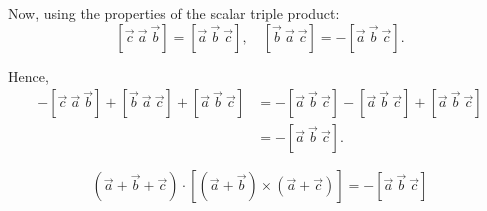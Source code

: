 \documentclass[12pt]{article}
\begin{document}
Now, using the properties of the scalar triple product:
\[
[\vec{c}\ \vec{a}\ \vec{b}] = [\vec{a}\ \vec{b}\ \vec{c}], 
\quad [\vec{b}\ \vec{a}\ \vec{c}] = -[\vec{a}\ \vec{b}\ \vec{c}].
\]

Hence,
\begin{align}
- [\vec{c}\ \vec{a}\ \vec{b}] + [\vec{b}\ \vec{a}\ \vec{c}] + [\vec{a}\ \vec{b}\ \vec{c}]
&= -[\vec{a}\ \vec{b}\ \vec{c}] - [\vec{a}\ \vec{b}\ \vec{c}] + [\vec{a}\ \vec{b}\ \vec{c}] \\[4pt]
&= -[\vec{a}\ \vec{b}\ \vec{c}].
\end{align}

\[
\boxed{(\vec{a} + \vec{b} + \vec{c}) \cdot [(\vec{a} + \vec{b}) \times (\vec{a} + \vec{c})] = -[\vec{a}\ \vec{b}\ \vec{c}]}
\]
\end{document}
